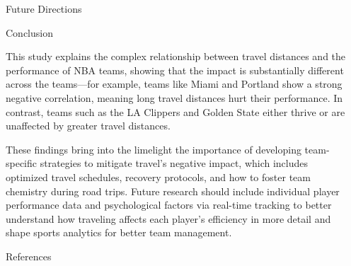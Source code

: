 \documentclass[final]{beamer}
\newlength{\sepwidth}
\newlength{\colwidth}
\newcommand{\separatorcolumn}{\begin{column}{\sepwidth}\end{column}}
\begin{document}
\begin{frame}[t]
\begin{columns}[t]
\begin{column}{\colwidth}
\begin{block}{Future Directions}
  \end{block}
  \begin{block}{Conclusion}

    This study explains the complex relationship between travel distances and the performance
of NBA teams, showing that the impact is substantially different across the teams—for
example, teams like Miami and Portland show a strong negative correlation, meaning long
travel distances hurt their performance. In contrast, teams such as the LA Clippers and
Golden State either thrive or are unaffected by greater travel distances. 


These findings bring
into the limelight the importance of developing team-specific strategies to mitigate travel’s
negative impact, which includes optimized travel schedules, recovery protocols, and how to
foster team chemistry during road trips. Future research should include individual player performance data and psychological factors via real-time tracking to better understand how
traveling affects each player’s efficiency in more detail and shape sports analytics for better
team management.

  \end{block}

  \begin{block}{References}

    \nocite{*}
    \footnotesize{}

  \end{block}

\end{column}

\separatorcolumn
\end{columns}
\end{frame}
\end{document}
